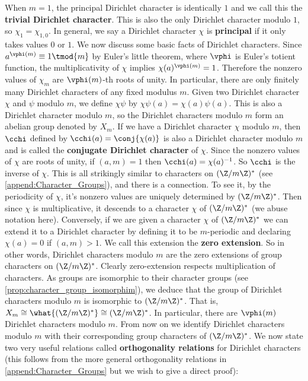       When $m = 1$, the principal Dirichlet character is identically $1$ and we call this the \textbf{trivial Dirichlet character}. This is also the only Dirichlet character modulo $1$, so $\chi_{1} = \chi_{1,0}$. In general, we say a Dirichlet character $\chi$ is \textbf{principal} if it only takes values $0$ or $1$. We now discuss some basic facts of Dirichlet characters. Since $a^{\vphi(m)} \equiv 1 \tmod{m}$ by Euler's little theorem, where $\vphi$ is Euler's totient function, the multiplicativity of $\chi$ implies $\chi(a)^{\vphi(m)} = 1$. Therefore the nonzero values of $\chi_{m}$ are $\vphi(m)$-th roots of unity. In particular, there are only finitely many Dirichlet characters of any fixed modulus $m$. Given two Dirichlet character $\chi$ and $\psi$ modulo $m$, we define $\chi\psi$ by $\chi\psi(a) = \chi(a)\psi(a)$. This is also a Dirichlet character modulo $m$, so the Dirichlet characters modulo $m$ form an abelian group denoted by $X_{m}$. If we have a Dirichlet character $\chi$ modulo $m$, then $\cchi$ defined by $\cchi(a) = \conj{\chi(a)}$ is also a Dirichlet character modulo $m$ and is called the \textbf{conjugate Dirichlet character} of $\chi$. Since the nonzero values of $\chi$ are roots of unity, if $(a,m) = 1$ then $\cchi(a) = \chi(a)^{-1}$. So $\cchi$ is the inverse of $\chi$. This is all strikingly similar to characters on $(\Z/m\Z)^{\ast}$ (see \cref{append:Character_Groups}), and there is a connection. To see it, by the periodicity of $\chi$, it's nonzero values are uniquely determined by $(\Z/m\Z)^{\ast}$. Then since $\chi$ is multiplicative, it descends to a character $\chi$ of $(\Z/m\Z)^{\ast}$ (we abuse notation here). Conversely, if we are given a character $\chi$ of $(\Z/m\Z)^{\ast}$ we can extend it to a Dirichlet character by defining it to be $m$-periodic and declaring $\chi(a) = 0$ if $(a,m) > 1$. We call this extension the \textbf{zero extension}. So in other words, Dirichlet characters modulo $m$ are the zero extensions of group characters on $(\Z/m\Z)^{\ast}$. Clearly zero-extension respects multiplication of characters. As groups are isomorphic to their character groups (see \cref{prop:character_group_isomorphim}), we deduce that the group of Dirichlet characters modulo $m$ is isomorphic to $(\Z/m\Z)^{\ast}$. That is, $X_{m} \cong \what{(\Z/m\Z)^{\ast}} \cong (\Z/m\Z)^{\ast}$. In particular, there are $\vphi(m)$ Dirichlet characters modulo $m$. From now on we identify Dirichlet characters modulo $m$ with their corresponding group characters of $(\Z/m\Z)^{\ast}$. We now state two very useful relations called \textbf{orthogonality relations} for Dirichlet characters (this follows from the more general orthogonality relations in \cref{append:Character_Groups} but we wish to give a direct proof):

